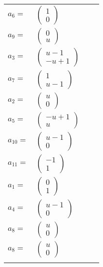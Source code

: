 \documentclass[1p]{elsarticle_modified}
\theoremstyle{definition}
\begin{document}
\begin{tabular}{m{7pt} m{180pt} m{7pt} m{180pt} }
\flushright $a_{6}=$&$\begin{pmatrix}1\\0\end{pmatrix}$ \\
\flushright $a_{9}=$&$\begin{pmatrix}0\\u\end{pmatrix}$ \\
\flushright $a_{3}=$&$\begin{pmatrix}u-1\\- u+1\end{pmatrix}$ \\
\flushright $a_{7}=$&$\begin{pmatrix}1\\u-1\end{pmatrix}$ \\
\flushright $a_{2}=$&$\begin{pmatrix}u\\0\end{pmatrix}$ \\
\flushright $a_{5}=$&$\begin{pmatrix}- u+1\\u\end{pmatrix}$ \\
\flushright $a_{10}=$&$\begin{pmatrix}u-1\\0\end{pmatrix}$ \\
\flushright $a_{11}=$&$\begin{pmatrix}-1\\1\end{pmatrix}$ \\
\flushright $a_{1}=$&$\begin{pmatrix}0\\1\end{pmatrix}$ \\
\flushright $a_{4}=$&$\begin{pmatrix}u-1\\0\end{pmatrix}$ \\
\flushright $a_{8}=$&$\begin{pmatrix}u\\0\end{pmatrix}$\\ \flushright $a_{8}=$&$\begin{pmatrix}u\\0\end{pmatrix}$\\&\end{tabular}
\end{document}
